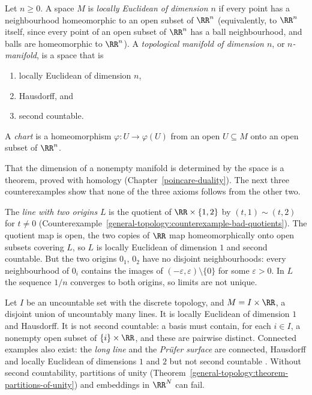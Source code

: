 \begin{definition}\label{topological-manifolds:definition-manifold}
Let $n \geq 0$. A space $M$ is \emph{locally Euclidean of dimension $n$} if every point has a neighbourhood homeomorphic to an open subset of $\RR^n$ (equivalently, to $\RR^n$ itself, since every point of an open subset of
$\RR^n$ has a ball neighbourhood, and balls are homeomorphic to $\RR^n$). A \emph{topological manifold of dimension $n$}, or \emph{$n$-manifold}, is a space that is
\begin{enumerate}
\item locally Euclidean of dimension $n$,
\item Hausdorff, and
\item second countable.
\end{enumerate}
A \emph{chart} is a homeomorphism $\varphi \colon U \to \varphi(U)$ from an open $U \subseteq M$ onto an open subset of $\RR^n$.
\end{definition}

That the dimension of a nonempty manifold is determined by the space is a theorem, proved with homology (Chapter~\ref{poincare-duality}). The next three counterexamples show that none of the three axioms follows from the
other two.

\begin{counterexample}\label{topological-manifolds:counterexample-not-hausdorff}
The \emph{line with two origins} $L$ is the quotient of $\RR \times \{1, 2\}$ by $(t, 1) \sim (t, 2)$ for $t \neq 0$ (Counterexample~\ref{general-topology:counterexample-bad-quotients}). The quotient map is open, the two copies of $\RR$
map homeomorphically onto open subsets covering $L$, so $L$ is locally Euclidean of dimension $1$ and second countable. But the two origins $0_1$, $0_2$ have no disjoint neighbourhoods: every neighbourhood of $0_i$
contains the images of $(-\varepsilon, \varepsilon) \setminus \{0\}$ for some $\varepsilon > 0$. In $L$ the sequence $1/n$ converges to both origins, so limits are not unique.
\end{counterexample}

\begin{counterexample}\label{topological-manifolds:counterexample-not-second-countable}
Let $I$ be an uncountable set with the discrete topology, and $M = I \times \RR$, a disjoint union of uncountably many lines. It is locally Euclidean of dimension $1$ and Hausdorff. It is not second countable: a basis must
contain, for each $i \in I$, a nonempty open subset of $\{i\} \times \RR$, and these are pairwise distinct. Connected examples also exist: the \emph{long line} and the \emph{Pr\"ufer surface} are connected, Hausdorff and locally
Euclidean of dimensions $1$ and $2$ but not second countable \cite{munkres-topology}. Without second countability, partitions of unity (Theorem~\ref{general-topology:theorem-partitions-of-unity}) and embeddings in
$\RR^N$ can fail.
\end{counterexample}

